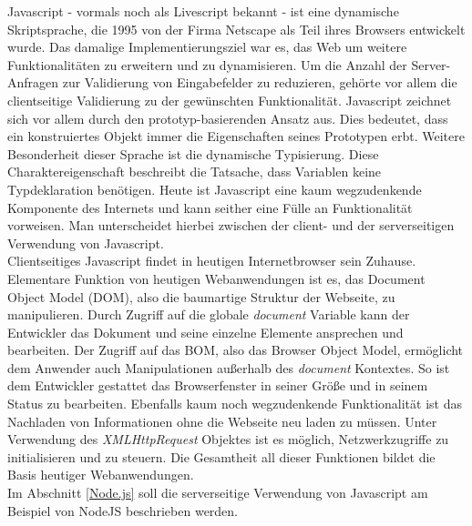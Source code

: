 Javascript - vormals noch als Livescript bekannt -  ist eine dynamische Skriptsprache, die 1995 von der Firma Netscape als Teil ihres Browsers entwickelt wurde. Das damalige Implementierungsziel war es, das Web um weitere Funktionalitäten zu erweitern und zu dynamisieren. Um die Anzahl der Server-Anfragen zur Validierung von Eingabefelder zu reduzieren, gehörte vor allem die clientseitige Validierung zu der gewünschten Funktionalität.
Javascript zeichnet sich vor allem durch den prototyp-basierenden Ansatz aus. Dies bedeutet, dass ein konstruiertes Objekt immer die Eigenschaften seines Prototypen erbt. Weitere Besonderheit dieser Sprache ist die dynamische Typisierung. Diese Charaktereigenschaft beschreibt die Tatsache, dass Variablen keine Typdeklaration benötigen. Heute ist Javascript eine kaum wegzudenkende Komponente des Internets und kann seither eine Fülle an Funktionalität vorweisen. Man unterscheidet hierbei zwischen der client- und der serverseitigen Verwendung von Javascript.\\
Clientseitiges Javascript findet in heutigen Internetbrowser sein Zuhause. Elementare Funktion von heutigen Webanwendungen ist es, das Document Object Model (DOM), also die baumartige Struktur der Webseite, zu manipulieren. Durch Zugriff auf die globale \textit{document} Variable kann der Entwickler das Dokument und seine einzelne Elemente ansprechen und bearbeiten. Der Zugriff auf das BOM, also das Browser Object Model, ermöglicht dem Anwender auch Manipulationen außerhalb des \textit{document} Kontextes. So ist dem Entwickler gestattet das Browserfenster in seiner Größe und in seinem Status zu  bearbeiten. Ebenfalls kaum noch wegzudenkende Funktionalität ist das Nachladen von Informationen ohne die Webseite neu laden zu müssen. Unter Verwendung des \textit{XMLHttpRequest} Objektes ist es möglich, Netzwerkzugriffe zu initialisieren und zu steuern. Die Gesamtheit all dieser Funktionen bildet die Basis heutiger Webanwendungen. \\
Im  Abschnitt \ref{Node.js} soll die serverseitige Verwendung von Javascript am Beispiel von NodeJS beschrieben werden. 


